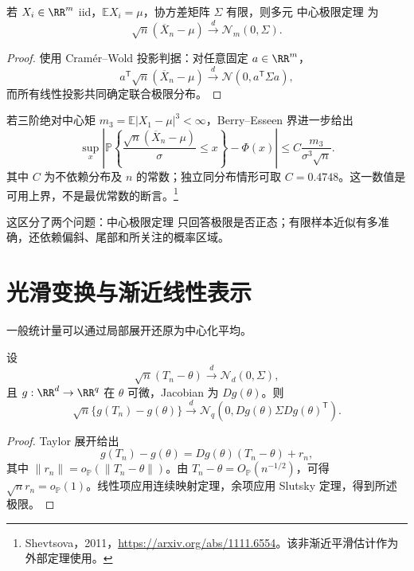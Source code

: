 \begin{corollary}[多元中心极限定理]
若 $X_i\in\RR^m$ iid，$\mathbb E X_i=\mu$，协方差矩阵 $\Sigma$ 有限，则多元 中心极限定理 为
\begin{equation*}\sqrt n(\overline X_n-\mu)
 \xrightarrow{d}\mathcal N_m(0,\Sigma).
\end{equation*}
\end{corollary}
\begin{proof}
使用 Cram\'er--Wold 投影判据：对任意固定 $a\in\RR^m$，
\[
 a^{\mathsf T}\sqrt n(\overline X_n-\mu)
 \xrightarrow{d}\mathcal N(0,a^{\mathsf T}\Sigma a),
\]
而所有线性投影共同确定联合极限分布。

\end{proof}

\begin{theorem}
若三阶绝对中心矩 $m_3=\mathbb E|X_1-\mu|^3<\infty$，Berry--Esseen 界进一步给出
\[
 \sup_x\left|
 \mathbb P\!\left\{\frac{\sqrt n(\overline X_n-\mu)}{\sigma}\le x\right\}
 -\Phi(x)
 \right|
 \le C\frac{m_3}{\sigma^3\sqrt n}.
\]
其中 $C$ 为不依赖分布及 $n$ 的常数；独立同分布情形可取 $C=0.4748$。这一数值是可用上界，不是最优常数的断言。\footnote{Shevtsova，2011，\url{https://arxiv.org/abs/1111.6554}。该非渐近平滑估计作为外部定理使用。}
\end{theorem}
这区分了两个问题：中心极限定理 只回答极限是否正态；有限样本近似有多准确，还依赖偏斜、尾部和所关注的概率区域。


\section{光滑变换与渐近线性表示}
一般统计量可以通过局部展开还原为中心化平均。

\begin{theorem}
设
\[
 \sqrt n(T_n-\theta)
 \xrightarrow{d}\mathcal N_d(0,\Sigma),
\]
且 $g:\RR^d\to\RR^q$ 在 $\theta$ 可微，Jacobian 为 $Dg(\theta)$。则
\begin{equation*}\sqrt n\{g(T_n)-g(\theta)\}
 \xrightarrow{d}
 \mathcal N_q\!\left(0,
 Dg(\theta)\Sigma Dg(\theta)^{\mathsf T}\right).
\end{equation*}
\end{theorem}
\begin{proof}
Taylor 展开给出
\[
 g(T_n)-g(\theta)
 =Dg(\theta)(T_n-\theta)+r_n,
\]
其中 $\|r_n\|=o_{\mathbb P}(\|T_n-\theta\|)$。由 $T_n-\theta=O_{\mathbb P}(n^{-1/2})$，可得 $\sqrt n r_n=o_{\mathbb P}(1)$。线性项应用连续映射定理，余项应用 Slutsky 定理，得到所述极限。
\end{proof}

